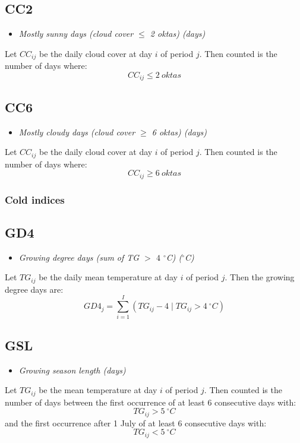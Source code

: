 \documentclass[a4paper,11pt]{article}
\begin{document}
\subsection*{CC2}
\begin{itemize}
\item \textit{Mostly sunny days (cloud cover $\leq$ 2 oktas) (days)}
\end{itemize}
Let $CC_{ij}$ be the daily cloud cover at day $i$ of period
$j$. Then counted is the number of days where:
\begin{equation*}
CC_{ij} \leq 2 \:oktas
\end{equation*}

\subsection*{CC6}
\begin{itemize}
\item \textit{Mostly cloudy days (cloud cover $\geq$ 6 oktas) (days)}
\end{itemize}
Let $CC_{ij}$ be the daily cloud cover at day $i$ of period
$j$. Then counted is the number of days where:
\begin{equation*}
CC_{ij} \geq 6 \:oktas
\end{equation*}


\subsubsection{Cold indices}

\subsection*{GD4}
\begin{itemize}
\item \textit{Growing degree days (sum of TG $>$ $4$ $^\circ$C)
($^\circ$C)}
\end{itemize}
Let $TG_{ij}$ be the daily mean temperature at day $i$ of period
$j$. Then the growing degree days are:
\begin{equation*}
GD4_{j} = \sum_{i=1}^{I}(TG_{ij}-4 \mid TG_{ij} > 4 \:^{\circ}C)
\end{equation*}

\subsection*{GSL}
\begin{itemize}
\item \textit{Growing season length (days)}
\end{itemize}
Let $TG_{ij}$ be the mean temperature at day $i$ of period $j$. Then
counted is the number of days between the first occurrence of at least 6
consecutive days with:
\begin{equation*}
TG_{ij} > 5 \:^\circ C
\end{equation*}
and the first occurrence after 1 July of at least 6 consecutive days
with: 
\begin{equation*}
TG_{ij} < 5 \:^\circ C
\end{equation*}
\end{document}
